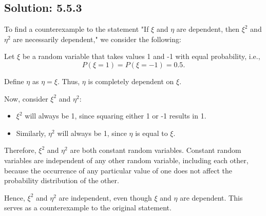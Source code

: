 \subsection*{Solution: 5.5.3}

To find a counterexample to the statement "If $\xi$ and $\eta$ are dependent, then $\xi^2$ and $\eta^2$ are necessarily dependent," we consider the following:

Let $\xi$ be a random variable that takes values 1 and -1 with equal probability, i.e.,
\[ P(\xi = 1) = P(\xi = -1) = 0.5. \]

Define $\eta$ as $\eta = \xi$. Thus, $\eta$ is completely dependent on $\xi$.

Now, consider $\xi^2$ and $\eta^2$:
\begin{itemize}
    \item $\xi^2$ will always be 1, since squaring either 1 or -1 results in 1.
    \item Similarly, $\eta^2$ will always be 1, since $\eta$ is equal to $\xi$.
\end{itemize}

Therefore, $\xi^2$ and $\eta^2$ are both constant random variables. Constant random variables are independent of any other random variable, including each other, because the occurrence of any particular value of one does not affect the probability distribution of the other.

Hence, $\xi^2$ and $\eta^2$ are independent, even though $\xi$ and $\eta$ are dependent. This serves as a counterexample to the original statement.


